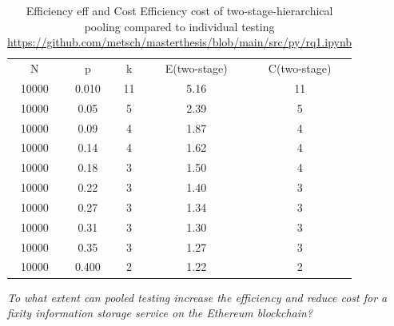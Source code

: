 \begin{table}[H]
    \caption{Efficiency \acrshort{eff} and Cost Efficiency \acrshort{cost} of two-stage-hierarchical pooling compared to individual testing \url{https://github.com/metsch/masterthesis/blob/main/src/py/rq1.ipynb}}
    \centering
    \begin{tabular}{ c c c c c}
    \label{tb:expected costs}
     N & p & k & E(\acrshort{two-stage}) & C(\acrshort{two-stage}) \\
     10000 & 0.010 & 11 & 5.16 & 11 \\ 
     \hline
     10000 & 0.05 & 5 & 2.39 & 5 \\  
     \hline
     10000 & 0.09 & 4 & 1.87 & 4 \\  
     \hline
     10000 & 0.14 & 4 & 1.62 & 4 \\  
     \hline
     10000 & 0.18 & 3 & 1.50 & 4  \\
     \hline
     10000 & 0.22 & 3 & 1.40 & 3  \\
     \hline
     10000 & 0.27 & 3 & 1.34 & 3  \\
     \hline
     10000 & 0.31 & 3 & 1.30 & 3  \\
     \hline
     10000 & 0.35 & 3 & 1.27 & 3  \\
     \hline
     10000 & 0.400 & 2 & 1.22 & 2  
    \end{tabular}
\end{table}

\textit{To what extent can pooled testing increase the efficiency and reduce cost for a fixity information storage service on the Ethereum blockchain?}

